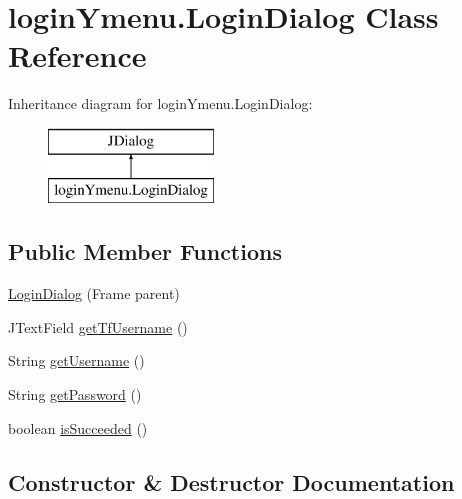 \hypertarget{classlogin_ymenu_1_1_login_dialog}{}\section{login\+Ymenu.\+Login\+Dialog Class Reference}
\label{classlogin_ymenu_1_1_login_dialog}
Inheritance diagram for login\+Ymenu.\+Login\+Dialog\+:\begin{figure}[H]
\begin{center}
\leavevmode
\includegraphics[height=2.000000cm]{classlogin_ymenu_1_1_login_dialog}
\end{center}
\end{figure}
\subsection*{Public Member Functions}
\begin{DoxyCompactItemize}
\item 
\mbox{\hyperlink{classlogin_ymenu_1_1_login_dialog_ae30001f50abf036aa13b6151dcf05efd}{Login\+Dialog}} (Frame parent)
\item 
J\+Text\+Field \mbox{\hyperlink{classlogin_ymenu_1_1_login_dialog_aefc830bcf203d258f7a61495105b1044}{get\+Tf\+Username}} ()
\item 
String \mbox{\hyperlink{classlogin_ymenu_1_1_login_dialog_adc9e277cc5f254e9729681fc8c3de8c4}{get\+Username}} ()
\item 
String \mbox{\hyperlink{classlogin_ymenu_1_1_login_dialog_a3799ca386dc95e8bf667249d31cf8c01}{get\+Password}} ()
\item 
boolean \mbox{\hyperlink{classlogin_ymenu_1_1_login_dialog_aa6faef4c9a279244ef68afd1e0414c1a}{is\+Succeeded}} ()
\end{DoxyCompactItemize}


\subsection{Constructor \& Destructor Documentation}
\mbox{\label{classlogin_ymenu_1_1_login_dialog_ae30001f50abf036aa13b6151dcf05efd}} 
